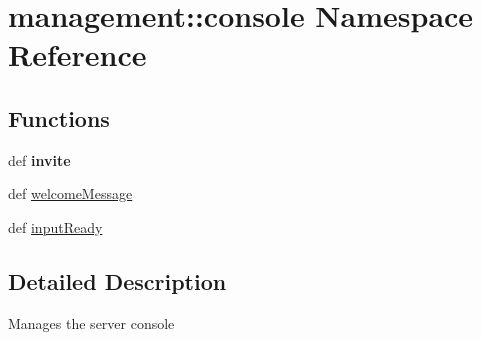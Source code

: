 \hypertarget{namespacemanagement_1_1console}{\section{management\-:\-:console \-Namespace \-Reference}
\label{namespacemanagement_1_1console}
}
\subsection*{\-Functions}
\begin{DoxyCompactItemize}
\item 
\hypertarget{namespacemanagement_1_1console_a634a1de8c98c877df3971661fc2b89df}{def {\bfseries invite}}\label{namespacemanagement_1_1console_a634a1de8c98c877df3971661fc2b89df}

\item 
def \hyperlink{namespacemanagement_1_1console_a4acef27fe2d664476446e89e52c7a0da}{welcome\-Message}
\item 
def \hyperlink{namespacemanagement_1_1console_a20f8a68f99228c008477a31a380a922f}{input\-Ready}
\end{DoxyCompactItemize}


\subsection{\-Detailed \-Description}
\begin{DoxyVerb}Manages the server console \end{DoxyVerb}
 


